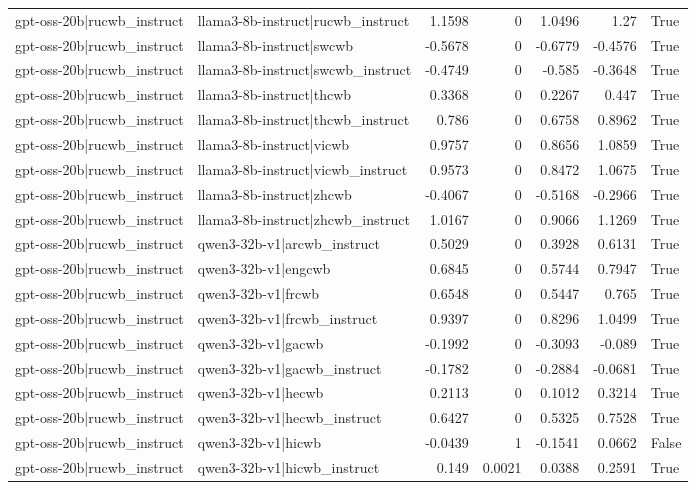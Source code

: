 \begin{table}
\begin{tabular}{l l r r r r l}
gpt-oss-20b|rucwb_instruct & llama3-8b-instruct|rucwb_instruct & 1.1598 & 0 & 1.0496 & 1.27 & True \\
gpt-oss-20b|rucwb_instruct & llama3-8b-instruct|swcwb & -0.5678 & 0 & -0.6779 & -0.4576 & True \\
gpt-oss-20b|rucwb_instruct & llama3-8b-instruct|swcwb_instruct & -0.4749 & 0 & -0.585 & -0.3648 & True \\
gpt-oss-20b|rucwb_instruct & llama3-8b-instruct|thcwb & 0.3368 & 0 & 0.2267 & 0.447 & True \\
gpt-oss-20b|rucwb_instruct & llama3-8b-instruct|thcwb_instruct & 0.786 & 0 & 0.6758 & 0.8962 & True \\
gpt-oss-20b|rucwb_instruct & llama3-8b-instruct|vicwb & 0.9757 & 0 & 0.8656 & 1.0859 & True \\
gpt-oss-20b|rucwb_instruct & llama3-8b-instruct|vicwb_instruct & 0.9573 & 0 & 0.8472 & 1.0675 & True \\
gpt-oss-20b|rucwb_instruct & llama3-8b-instruct|zhcwb & -0.4067 & 0 & -0.5168 & -0.2966 & True \\
gpt-oss-20b|rucwb_instruct & llama3-8b-instruct|zhcwb_instruct & 1.0167 & 0 & 0.9066 & 1.1269 & True \\
gpt-oss-20b|rucwb_instruct & qwen3-32b-v1|arcwb_instruct & 0.5029 & 0 & 0.3928 & 0.6131 & True \\
gpt-oss-20b|rucwb_instruct & qwen3-32b-v1|engcwb & 0.6845 & 0 & 0.5744 & 0.7947 & True \\
gpt-oss-20b|rucwb_instruct & qwen3-32b-v1|frcwb & 0.6548 & 0 & 0.5447 & 0.765 & True \\
gpt-oss-20b|rucwb_instruct & qwen3-32b-v1|frcwb_instruct & 0.9397 & 0 & 0.8296 & 1.0499 & True \\
gpt-oss-20b|rucwb_instruct & qwen3-32b-v1|gacwb & -0.1992 & 0 & -0.3093 & -0.089 & True \\
gpt-oss-20b|rucwb_instruct & qwen3-32b-v1|gacwb_instruct & -0.1782 & 0 & -0.2884 & -0.0681 & True \\
gpt-oss-20b|rucwb_instruct & qwen3-32b-v1|hecwb & 0.2113 & 0 & 0.1012 & 0.3214 & True \\
gpt-oss-20b|rucwb_instruct & qwen3-32b-v1|hecwb_instruct & 0.6427 & 0 & 0.5325 & 0.7528 & True \\
gpt-oss-20b|rucwb_instruct & qwen3-32b-v1|hicwb & -0.0439 & 1 & -0.1541 & 0.0662 & False \\
gpt-oss-20b|rucwb_instruct & qwen3-32b-v1|hicwb_instruct & 0.149 & 0.0021 & 0.0388 & 0.2591 & True \\

\end{tabular}
\end{table}
